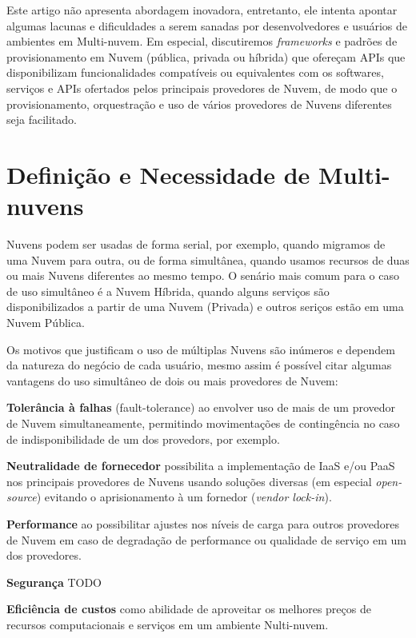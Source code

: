\documentclass[12pt]{article}
\begin{document}
	    Este artigo não apresenta abordagem inovadora, entretanto, ele intenta apontar algumas lacunas e dificuldades a serem sanadas por desenvolvedores e usuários de ambientes em Multi-nuvem. Em especial, discutiremos \textit{frameworks} e padrões de provisionamento em Nuvem (pública, privada ou híbrida) que ofereçam APIs que disponibilizam funcionalidades compatíveis ou equivalentes com os softwares,  serviços e APIs ofertados pelos principais provedores de Nuvem, de modo que o provisionamento, orquestração e uso de vários provedores de Nuvens diferentes seja facilitado.
		
	\section{Definição e Necessidade de Multi-nuvens}
	
	Nuvens podem ser usadas de forma serial, por exemplo, quando migramos de uma Nuvem para outra, ou de forma simultânea, quando usamos recursos de duas ou mais Nuvens diferentes ao mesmo tempo. O senário mais comum para o caso de uso simultâneo é a Nuvem Híbrida, quando alguns serviços são disponibilizados a partir de uma Nuvem (Privada) e outros seriços estão em uma Nuvem Pública.
	
	Os motivos que justificam o uso de múltiplas Nuvens são inúmeros e dependem da natureza do negócio de cada usuário, mesmo assim é possível citar algumas vantagens do uso simultâneo de dois ou mais provedores de Nuvem:
	
	\textbf{Tolerância à falhas} (fault-tolerance) ao envolver uso de mais de um provedor de Nuvem simultaneamente, permitindo movimentações de contingência no caso de indisponibilidade de um dos provedors, por exemplo.
	
	\textbf{Neutralidade de fornecedor} possibilita a implementação de IaaS e/ou PaaS nos principais provedores de Nuvens usando soluções diversas (em especial \textit{open-source}) evitando o aprisionamento à um fornedor (\textit{vendor lock-in}).
	
	\textbf{Performance} ao possibilitar ajustes nos níveis de carga para outros provedores de Nuvem em caso de degradação de performance ou qualidade de serviço em um dos provedores.
	
	\textbf{Segurança} TODO
	
	\textbf{Eficiência de custos} como abilidade de aproveitar os melhores preços de recursos computacionais e serviços em um ambiente Nulti-nuvem.
	
\end{document}
